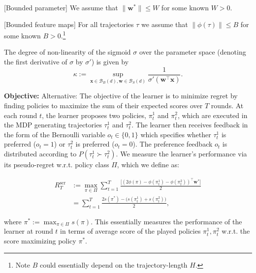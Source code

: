 \begin{assumption}
\label{assumption::bounded_parameter}[Bounded parameter] We assume that $\| {\mathbf w}^*\|\leq W$ for some known $W > 0$.
\end{assumption}

\begin{assumption}
\label{assumption::bounded_features}[Bounded feature maps] For all trajectories $\tau$ we assume that $\| \phi(\tau)\|\leq B$ for some known $B > 0$.\footnote{Note $B$ could essentially depend on the trajectory-length $H$.}
\end{assumption}

\begin{definition}\label{assump:kappa}
The degree of non-linearity of the sigmoid $\sigma$ over the parameter space (denoting the first derivative of $\sigma$ by $\sigma'$) is given by $$
\kappa:= \sup_{{\mathbf x} \in {\mathcal B}_B(d), {\mathbf w} \in {\mathcal B}_S(d)} \frac{1}{{\sigma'}({\mathbf w}^\top{\mathbf x})}. $$
\end{definition}

\textbf{Objective:} Alternative: The objective of the learner is to minimize regret by finding policies to maximize the sum of their expected scores over $T$ rounds. At each round $t$, the learner proposes two policies, $\pi^1_t$ and $\pi^2_t$, which are executed in the MDP generating trajectories $\tau_t^1$ and $\tau_t^2$. The learner then receives feedback in the form of the Bernoulli variable $o_t \in \{0, 1\}$ which specifies whether $\tau^1_t$ is preferred ($o_t = 1$) or $\tau^2_t$ is preferred ($o_t = 0$). The preference feedback $o_t$ is distributed according to $P(\tau_t^1 \succ \tau^2_t)$. We measure the learner's performance via its pseudo-regret w.r.t. policy class $\Pi$, which we define as:

\begin{align}
\label{eq:reg1}
\nonumber R_T^{\text{scr}} &:= \max_{\pi \in \Pi}\sum_{t = 1}^T\frac{\big[ (2\phi(\pi) - \phi(\pi_t^1) - \phi(\pi_t^2))^\top {\mathbf w}^* \big] }{2}\\
&= \sum_{t = 1}^T \frac{2s(\pi^*) - \big(s(\pi_t^1)+s(\pi_t^2)\big)}{2},
\end{align}

where $\pi^*:= \max_{\pi \in \Pi}s(\pi)$. This essentially measures the performance of the learner at round $t$ in terms of average score of the played policies $\pi_t^1, \pi_t^2$ w.r.t. the score maximizing policy $\pi^*$.

